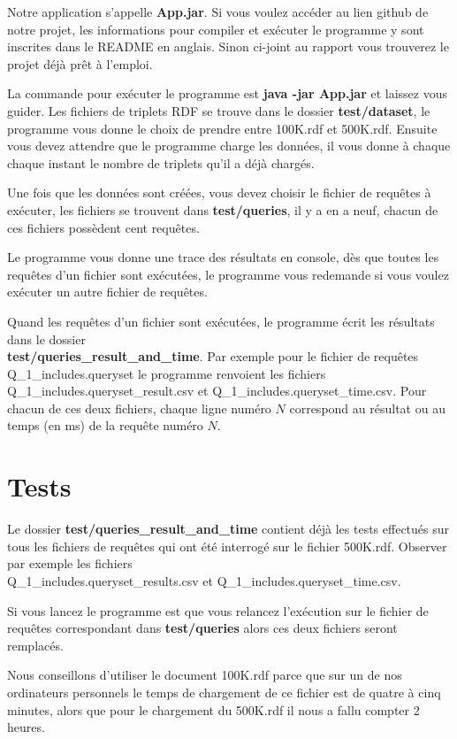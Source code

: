 \documentclass[12pt]{report}
\begin{document}
Notre application s'appelle \textbf{App.jar}. Si vous voulez accéder au lien github de notre projet, les informations pour compiler et exécuter le programme y sont inscrites dans le README en anglais. Sinon ci-joint au rapport vous trouverez le projet déjà prêt à l'emploi. 

La commande pour exécuter le programme est \textbf{java -jar App.jar} et laissez vous guider. Les fichiers de triplets RDF se trouve dans le dossier \textbf{test/dataset}, le programme vous donne le choix de prendre entre 100K.rdf et 500K.rdf. Ensuite vous devez attendre que le programme charge les données, il vous donne à chaque chaque instant le nombre de triplets qu'il a déjà chargés. 

Une fois que les données sont créées, vous devez choisir le fichier de requêtes à exécuter, les fichiers se trouvent dans \textbf{test/queries}, il y a en a neuf, chacun de ces fichiers possèdent cent requêtes.

Le programme vous donne une trace des résultats en console, dès que toutes les requêtes d'un fichier sont exécutées, le programme vous redemande si vous voulez exécuter un autre fichier de requêtes.

Quand les requêtes d'un fichier sont exécutées, le programme écrit les résultats dans le dossier \\
\textbf{test/queries\_result\_and\_time}. Par exemple pour le fichier de requêtes \\Q\_1\_includes.queryset le programme renvoient les fichiers Q\_1\_includes.queryset\_result.csv et Q\_1\_includes.queryset\_time.csv. Pour chacun de ces deux fichiers, chaque ligne numéro $N$ correspond au résultat ou au temps (en ms) de la requête numéro $N$.

\section{Tests}
Le dossier \textbf{test/queries\_result\_and\_time} contient déjà les tests effectués sur tous les fichiers de requêtes qui ont été interrogé sur le fichier 500K.rdf. Observer par exemple les fichiers \\Q\_1\_includes.queryset\_results.csv et Q\_1\_includes.queryset\_time.csv. 

Si vous lancez le programme est que vous relancez l'exécution sur le fichier de requêtes correspondant dans \textbf{test/queries} alors ces deux fichiers seront remplacés.

Nous conseillons d'utiliser le document 100K.rdf parce que sur un de nos ordinateurs personnels le temps de chargement de ce fichier est de quatre à cinq minutes, alors que pour le chargement du 500K.rdf il nous a fallu compter 2 heures.
\end{document}
